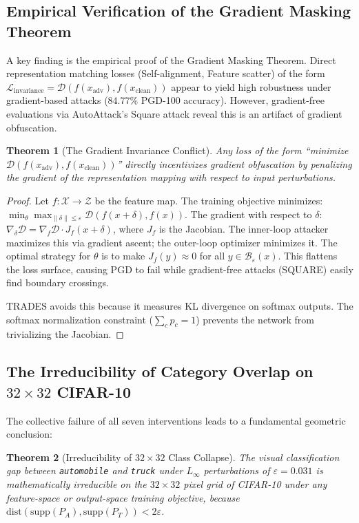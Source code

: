 \documentclass[12pt,a4paper]{article}
\newtheorem{theorem}{Theorem}[section]
\begin{document}
\subsection{Empirical Verification of the Gradient Masking Theorem}

A key finding is the empirical proof of the Gradient Masking Theorem.
Direct representation matching losses (Self-alignment, Feature scatter)
of the form
$\mathcal{L}_{\text{invariance}} = \mathcal{D}(f(x_{\text{adv}}), f(x_{\text{clean}}))$
appear to yield high robustness under gradient-based attacks (84.77\%
PGD-100 accuracy). However, gradient-free evaluations via AutoAttack's
Square attack reveal this is an artifact of gradient obfuscation.

\begin{theorem}[The Gradient Invariance Conflict]
Any loss of the form ``minimize
$\mathcal{D}(f(x_{\text{adv}}), f(x_{\text{clean}}))$''
directly incentivizes gradient obfuscation by penalizing the gradient of
the representation mapping with respect to input perturbations.
\end{theorem}

\begin{proof}
Let $f: \mathcal{X} \to \mathcal{Z}$ be the feature map. The training
objective minimizes:
$\min_\theta \max_{\|\delta\| \le \varepsilon}
\mathcal{D}(f(x + \delta), f(x))$.
The gradient with respect to $\delta$:
$\nabla_\delta \mathcal{D} = \nabla_f \mathcal{D} \cdot J_f(x + \delta)$,
where $J_f$ is the Jacobian. The inner-loop attacker maximizes this via
gradient ascent; the outer-loop optimizer minimizes it. The optimal strategy
for $\theta$ is to make $J_f(y) \approx 0$ for all
$y \in \mathcal{B}_\varepsilon(x)$. This flattens the loss surface,
causing PGD to fail while gradient-free attacks (SQUARE) easily find
boundary crossings.

TRADES avoids this because it measures KL divergence on softmax outputs.
The softmax normalization constraint ($\sum_c p_c = 1$) prevents the
network from trivializing the Jacobian.
\end{proof}

\subsection{The Irreducibility of Category Overlap on $32\times32$ CIFAR-10}

The collective failure of all seven interventions leads to a fundamental
geometric conclusion:

\begin{theorem}[Irreducibility of $32{\times}32$ Class Collapse]
The visual classification gap between \texttt{automobile} and \texttt{truck}
under $L_\infty$ perturbations of $\varepsilon=0.031$ is mathematically
irreducible on the $32{\times}32$ pixel grid of CIFAR-10 under any
feature-space or output-space training objective, because
$\mathrm{dist}(\mathrm{supp}(P_A), \mathrm{supp}(P_T)) < 2\varepsilon$.
\end{theorem}
\end{document}
